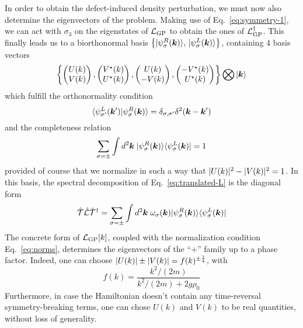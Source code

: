 In order to obtain the defect-induced density perturbation, we must
now also determine the eigenvectors of the problem. Making use of
Eq.~\eqref{eq:symmetry-1}, we can act with $\sigma_3$ on the
eigenstates of $\mathcal{L}_{\text{GP}}$ to obtain the ones of
$\mathcal{L}_{\text{GP}}^{\dagger}$. This finally leads us to a biorthonormal
basis
$\left\{ \vert \psi_\sigma^R(\bm{k}) \rangle,\, \vert \psi_\sigma^L(\bm{k}) \rangle
\right\}$, containing 4 basis vectors
%
\begin{equation}\label{eq:biorthobasis}
  \left\{ \begin{pmatrix} U(k)\\ V(k) \end{pmatrix}, \begin{pmatrix} V^{\star}(k)\\ U^{\star}(k) \end{pmatrix}, \begin{pmatrix} U(k)\\ -V(k) \end{pmatrix}, \begin{pmatrix} -V^{\star}(k)\\ U^{\star}(k) \end{pmatrix} \right\} \bigotimes \vert \bm{k} \rangle
\end{equation}
% 
which fulfill the orthonormality condition
%
\begin{equation}\label{eq:binormality}
  \langle \psi_{\sigma^{\prime}}^L(\bm{k}^{\prime}) \vert \psi_\sigma^R(\bm{k}) \rangle = \delta_{\sigma,\sigma^{\prime}} \delta^2(\bm{k} - \bm{k}^{\prime})
\end{equation}
% 
and the completeness relation
%
\begin{equation}\label{eq:bicompleteness}
  \sum_{\sigma = \pm} \int d^2 \bm{k} \; \vert \psi_\sigma^R(\bm{k}) \rangle\langle \psi_\sigma^L(\bm{k}) \vert = 1
\end{equation}
% 
provided of course that we normalize in such a way that
$\vert U(k) \vert^2 - \vert V(k) \vert^2 = 1$. In this basis, the spectral
decomposition of Eq.~\eqref{eq:translated-L} is the diagonal form
%
\begin{equation}\label{eq:bidecomposition}
  \hat{\mathcal{T}} \hat{\mathcal{L}} \hat{\mathcal{T}}^{\dagger} = \sum_{\sigma = \pm} \int d^2 \bm{k} \; \omega_\sigma(\bm{k}) \vert \psi_\sigma^R(\bm{k}) \rangle\langle \psi_\sigma^L(\bm{k}) \vert
\end{equation}
% 
The concrete form of $\mathcal{L}_{\text{GP}}[k]$, coupled with the
normalization condition Eq.~\eqref{eq:norms}, determines the
eigenvectors of the ``+'' family up to a phase factor. Indeed, one can
choose $\vert U(k) \vert \pm \vert V(k) \vert = f(k)^{\pm\frac{1}{4}}$, with 
%
\begin{equation}
  f(k) = \frac{k^2/(2m)}{k^2/(2m) + 2g\rho_0}
\end{equation}
% 
Furthermore, in case the Hamiltonian doesn't contain any time-reversal
symmetry-breaking terms, one can chose $U(k)$ and $V(k)$ to be real
quantities, without loss of generality.

